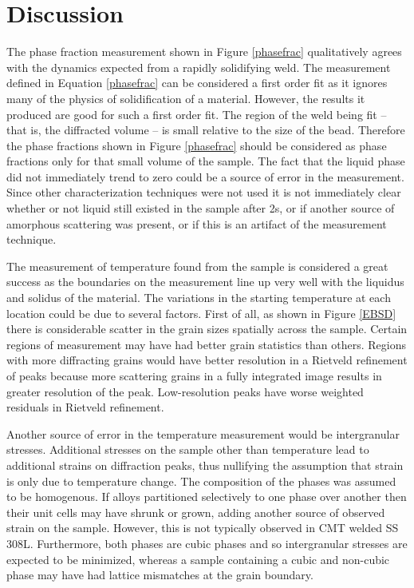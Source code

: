 \documentclass[twocolumn,nofootinbib,notitlepage,aps]{revtex4-1}
\begin{document}
\section{Discussion}
The phase fraction measurement shown in Figure \ref{phasefrac} qualitatively agrees with the dynamics expected from a rapidly solidifying weld. The measurement defined in Equation \ref{phasefrac} can be considered a first order fit as it ignores many of the physics of solidification of a material. However, the results it produced are good for such a first order fit. The region of the weld being fit -- that is, the diffracted volume --  is small relative to the size of the bead. Therefore the phase fractions shown in Figure \ref{phasefrac} should be considered as phase fractions only for that small volume of the sample. The fact that the liquid phase did not immediately trend to zero could be a source of error in the measurement. Since other characterization techniques were not used it is not immediately clear whether or not liquid still existed in the sample after 2s, or if another source of amorphous scattering was present, or if this is an artifact of the measurement technique. 

The measurement of temperature found from the sample is considered a great success as the boundaries on the measurement line up very well with the liquidus and solidus of the material. The variations in the starting temperature at each location could be due to several factors. First of all, as shown in Figure \ref{EBSD} there is considerable scatter in the grain sizes spatially across the sample. Certain regions of measurement may have had better grain statistics than others. Regions with more diffracting grains would have better resolution in a Rietveld refinement of peaks because more scattering grains in a fully integrated image results in greater resolution of the peak. Low-resolution peaks have worse weighted residuals in Rietveld refinement.

Another source of error in the temperature measurement would be intergranular stresses. Additional stresses on the sample other than temperature lead to additional strains on diffraction peaks, thus nullifying the assumption that strain is only due to temperature change. The composition of the phases was assumed to be homogenous. If alloys partitioned selectively to one phase over another then their unit cells may have shrunk or grown, adding another source of observed strain on the sample. However, this is not typically observed in CMT welded SS 308L. Furthermore, both phases are cubic phases and so intergranular stresses are expected to be minimized, whereas a sample containing a cubic and non-cubic phase may have had lattice mismatches at the grain boundary. 
\end{document}
